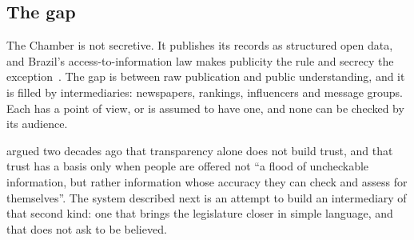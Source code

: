 \subsection{The gap}

The Chamber is not secretive. It publishes its records as structured open data, and Brazil's access-to-information law makes publicity the rule and secrecy the exception~\citep{brasil2011lai}. The gap is between raw publication and public understanding, and it is filled by intermediaries: newspapers, rankings, influencers and message groups. Each has a point of view, or is assumed to have one, and none can be checked by its audience.

\citet{oneill2002question} argued two decades ago that transparency alone does not build trust, and that trust has a basis only when people are offered not ``a flood of uncheckable information, but rather information whose accuracy they can check and assess for themselves''. The system described next is an attempt to build an intermediary of that second kind: one that brings the legislature closer in simple language, and that does not ask to be believed.
